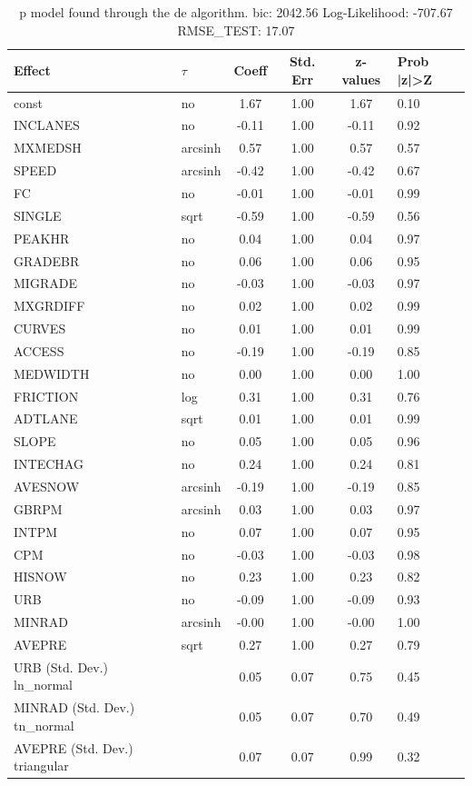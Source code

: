 \begin{table}
	\caption{p model found through the de algorithm. bic: 2042.56 Log-Likelihood: -707.67 RMSE_TEST: 17.07}
	\begin{center}
		\begin{tabular}{|l|l|c|c|c|l|}
			\hline
			Effect & $\tau$ & Coeff & Std. Err & z-values & Prob |z|>Z \\
			\hline
			const & no & 1.67 & 1.00 & 1.67 & 0.10 \\
			\hline
			INCLANES & no & -0.11 & 1.00 & -0.11 & 0.92 \\
			\hline
			MXMEDSH & arcsinh & 0.57 & 1.00 & 0.57 & 0.57 \\
			\hline
			SPEED & arcsinh & -0.42 & 1.00 & -0.42 & 0.67 \\
			\hline
			FC & no & -0.01 & 1.00 & -0.01 & 0.99 \\
			\hline
			SINGLE & sqrt & -0.59 & 1.00 & -0.59 & 0.56 \\
			\hline
			PEAKHR & no & 0.04 & 1.00 & 0.04 & 0.97 \\
			\hline
			GRADEBR & no & 0.06 & 1.00 & 0.06 & 0.95 \\
			\hline
			MIGRADE & no & -0.03 & 1.00 & -0.03 & 0.97 \\
			\hline
			MXGRDIFF & no & 0.02 & 1.00 & 0.02 & 0.99 \\
			\hline
			CURVES & no & 0.01 & 1.00 & 0.01 & 0.99 \\
			\hline
			ACCESS & no & -0.19 & 1.00 & -0.19 & 0.85 \\
			\hline
			MEDWIDTH & no & 0.00 & 1.00 & 0.00 & 1.00 \\
			\hline
			FRICTION & log & 0.31 & 1.00 & 0.31 & 0.76 \\
			\hline
			ADTLANE & sqrt & 0.01 & 1.00 & 0.01 & 0.99 \\
			\hline
			SLOPE & no & 0.05 & 1.00 & 0.05 & 0.96 \\
			\hline
			INTECHAG & no & 0.24 & 1.00 & 0.24 & 0.81 \\
			\hline
			AVESNOW & arcsinh & -0.19 & 1.00 & -0.19 & 0.85 \\
			\hline
			GBRPM & arcsinh & 0.03 & 1.00 & 0.03 & 0.97 \\
			\hline
			INTPM & no & 0.07 & 1.00 & 0.07 & 0.95 \\
			\hline
			CPM & no & -0.03 & 1.00 & -0.03 & 0.98 \\
			\hline
			HISNOW & no & 0.23 & 1.00 & 0.23 & 0.82 \\
			\hline
			URB & no & -0.09 & 1.00 & -0.09 & 0.93 \\
			\hline
			MINRAD & arcsinh & -0.00 & 1.00 & -0.00 & 1.00 \\
			\hline
			AVEPRE & sqrt & 0.27 & 1.00 & 0.27 & 0.79 \\
			\hline
			URB (Std. Dev.) ln_normal &  & 0.05 & 0.07 & 0.75 & 0.45 \\
			\hline
			MINRAD (Std. Dev.) tn_normal &  & 0.05 & 0.07 & 0.70 & 0.49 \\
			\hline
			AVEPRE (Std. Dev.) triangular &  & 0.07 & 0.07 & 0.99 & 0.32 \\
			\hline
		\end{tabular}
	\end{center}
\end{table}